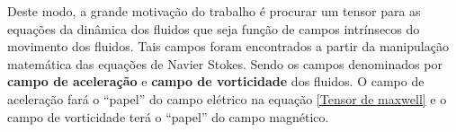 Deste modo, a grande motivação do trabalho é procurar um tensor para as equações da dinâmica dos fluidos que seja função de campos intrínsecos do movimento dos fluidos. Tais campos foram encontrados a partir da manipulação matemática das equações de Navier Stokes. Sendo os campos denominados por \textbf{campo de aceleração} e \textbf{campo de vorticidade} dos fluidos. O campo de aceleração fará o “papel” do campo elétrico na equação \ref{Tensor de maxwell} e o campo de vorticidade terá o “papel” do campo magnético.